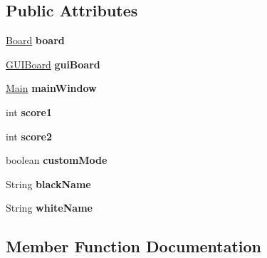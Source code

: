 \subsection*{Public Attributes}
\begin{DoxyCompactItemize}
\item 
\mbox{\label{classcontroller_1_1_controller_a3d56c576c4f3a12e8abfddc9a69fd994}} 
\mbox{\hyperlink{classmain_1_1_board}{Board}} {\bfseries board}
\item 
\mbox{\label{classcontroller_1_1_controller_a331e08373c3c83fce5e754a385f1ee69}} 
\mbox{\hyperlink{class_g_u_i_1_1_g_u_i_board}{G\+U\+I\+Board}} {\bfseries gui\+Board}
\item 
\mbox{\label{classcontroller_1_1_controller_a15d46dfda0e4e828b1196912a8d93821}} 
\mbox{\hyperlink{class_g_u_i_1_1_main}{Main}} {\bfseries main\+Window}
\item 
\mbox{\label{classcontroller_1_1_controller_a277855441c2d9125f1c872ee9d03b18b}} 
int {\bfseries score1}
\item 
\mbox{\label{classcontroller_1_1_controller_a808e7e0237d13d4607c1cc5aaebc67e2}} 
int {\bfseries score2}
\item 
\mbox{\label{classcontroller_1_1_controller_a155aee4f56e6261e91f480d9275805ac}} 
boolean {\bfseries custom\+Mode}
\item 
\mbox{\label{classcontroller_1_1_controller_a71e422cd3e140bd6c7ce4f556c8ad67e}} 
String {\bfseries black\+Name}
\item 
\mbox{\label{classcontroller_1_1_controller_ac76189cee454bed016a8484a0c325312}} 
String {\bfseries white\+Name}
\end{DoxyCompactItemize}


\subsection{Member Function Documentation}
\mbox{\label{classcontroller_1_1_controller_ab82a41df79bac7338424998579c31729}} 
